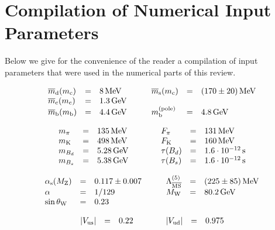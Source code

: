 \section{Compilation of Numerical Input Parameters}
        \label{app:numinput}
Below we give for the convenience of the reader a compilation of input
parameters that were used in the numerical parts of this review.

\smallskip

\begin{displaymath}
\begin{array}{lclclcl}
\overline{m}_{\rm d}(m_{\rm c}) &=& 8\, {\rm MeV}   &\quad&
\overline{m}_{\rm s}(m_{\rm c}) &=& (170 \pm 20)\, {\rm MeV} \\
\overline{m}_{\rm c}(m_{\rm c}) &=& 1.3\, {\rm GeV} &\quad& \\
\overline{m}_{\rm b}(m_{\rm b}) &=& 4.4\, {\rm GeV} &\quad&
m_{\rm b}^{\rm (pole)}    &=& 4.8\, {\rm GeV}
\end{array}
\end{displaymath}

\smallskip

\begin{displaymath}
\begin{array}{lclclcl}
m_\pi     &=& 135\, {\rm MeV} &\qquad& F_\pi     &=& 131\, {\rm MeV} \\
m_{\rm K} &=& 498\, {\rm MeV} &\qquad& F_{\rm K} &=& 160\, {\rm MeV} \\
m_{B_d} &=& 5.28\, {\rm GeV} &\quad& \tau(B_d) &=& 1.6 \cdot 10^{-12}\,{\rm s} \\
m_{B_s} &=& 5.38\, {\rm GeV} &\quad& \tau(B_s) &=& 1.6 \cdot 10^{-12}\,{\rm s}
\end{array}
\end{displaymath}

\smallskip

\begin{displaymath}
\begin{array}{lclclcl}
\alpha_{\rm s}(M_{\rm Z})  &=& 0.117 \pm 0.007
&\quad&
\Lambda_{\overline{\rm MS}}^{(5)}&=& (225 \pm 85)\, {\rm MeV} \\
\alpha      &=& 1/129 &\quad& M_{\rm W} &=& 80.2\, {\rm GeV} \\
\sin\theta_{\rm W} &=& 0.23 &\quad& &&
\end{array}
\end{displaymath}

\smallskip

\begin{displaymath}
\begin{array}{lclclcl}
\left|V_{\rm us}\right| &=& 0.22 &\qquad&
\left|V_{\rm ud}\right| &=& 0.975
\end{array}
\end{displaymath}


